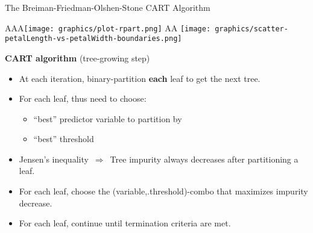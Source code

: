 


\begin{frame}{\vskip -0.2cm \large The Breiman-Friedman-Olshen-Stone CART Algorithm}

\small

\begin{multicols}{2}

	\begin{flushright}
	\begin{minipage}{4.5cm}
	\vskip -0.4cm
	{\color{white}AAA}\texttt{[image: graphics/plot-rpart.png]}
	\vskip 0.1cm 
	{\color{white}AA}
	\texttt{[image: graphics/scatter-petalLength-vs-petalWidth-boundaries.png]}
	\end{minipage}
	\end{flushright}

\columnbreak

	\begin{flushleft}
	\begin{minipage}{5.75cm}
	\vskip -0.1cm
	\scriptsize
	\pause
	\textbf{\normalsize CART algorithm} (tree-growing step)
	\begin{itemize}
	\item
		\pause
		At each iteration, binary-partition \textbf{\color{red}each} leaf to get the next tree.
	\item
		\pause
		For each leaf, thus need to choose:
		\vskip -0.2cm
		\begin{itemize}
		\setlength{\itemindent}{-0.2in}
		\item
			\pause
			\vskip -0.1cm {\scriptsize``best'' predictor variable to partition by}
		\item
			\pause
			\vskip -0.1cm {\scriptsize``best'' threshold}
		\end{itemize}
	\item
		\pause
		Jensen's inequality \,$\Longrightarrow$\,
		{\color{red}Tree impurity always decreases after partitioning a leaf.}
	\item
		\pause
		For each leaf, choose the (variable,{\color{white}.}threshold)-combo
		that maximizes impurity decrease.
	\item
		\pause
		For each leaf, continue until termination criteria are met.
	\end{itemize}
	\end{minipage}
	\end{flushleft}


\end{multicols}
\end{frame}
